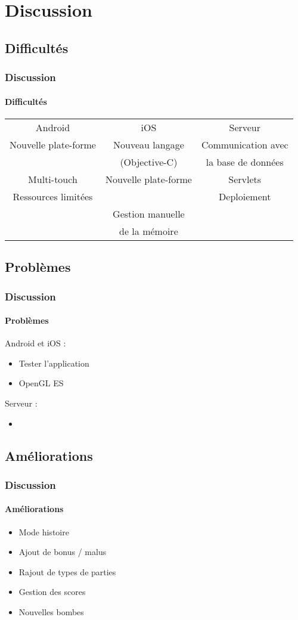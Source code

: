 \section{Discussion}

	\subsection{Difficultés}
		\begin{frame}
			\frametitle{Discussion}
			\framesubtitle{Difficultés}
				\begin{tabular}{ccc}
					Android & iOS & Serveur \\

						Nouvelle plate-forme & Nouveau langage  & Communication avec \\
										 & (Objective-C) & la base de données\\
						Multi-touch & Nouvelle plate-forme &Servlets\\
						Ressources limitées & & Deploiement\\
						  & Gestion manuelle & \\
						  &  de la mémoire & \\

			\end{tabular}
		\end{frame}
		
		
	\subsection{Problèmes}
		\begin{frame}
			\frametitle{Discussion}
			\framesubtitle{Problèmes}
			Android et iOS :
			\begin{itemize}
				\item Tester l'application
				\item OpenGL ES
			\end{itemize}
			
			Serveur :
			\begin{itemize}
				\item 
			\end{itemize}
		\end{frame}
		
		
	\subsection{Améliorations}
		\begin{frame}
			\frametitle{Discussion}
			\framesubtitle{Améliorations}
			\begin{itemize}
				\item Mode histoire
				\item Ajout de bonus / malus
				\item Rajout de types de parties
				\item Gestion des scores
				\item Nouvelles bombes
			\end{itemize}
		\end{frame}
